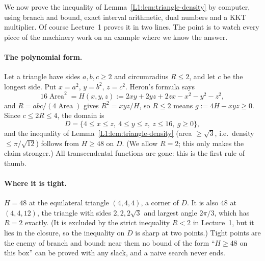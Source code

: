 We now prove the inequality of Lemma~\ref{L1:lem:triangle-density} by computer, using branch and bound, exact interval
arithmetic, dual numbers and a KKT multiplier. Of course Lecture~1 proves it in two lines. The point is to
watch every piece of the machinery work on an example where we know the answer.

\paragraph{The polynomial form.} Let a triangle have sides $a,b,c\ge2$ and circumradius $R\le2$, and let
$c$ be the longest side. Put $x=a^2$, $y=b^2$, $z=c^2$. Heron's formula says
\[
  16\operatorname{Area}^2=H(x,y,z):=2xy+2yz+2zx-x^2-y^2-z^2,
\]
and $R=abc/(4\operatorname{Area})$ gives $R^2=xyz/H$, so $R\le2$ means $g:=4H-xyz\ge0$. Since $c\le2R\le4$,
the domain is
\[
  D=\{4\le x\le z,\ 4\le y\le z,\ z\le16,\ g\ge0\},
\]
and the inequality of Lemma~\ref{L1:lem:triangle-density} (area $\ge\sqrt3$, i.e.\ density
$\le\pi/\sqrt{12}$) follows from $H\ge48$ on $D$. (We allow $R=2$; this only makes the claim stronger.) All transcendental functions are gone: this is
the first rule of thumb.

\paragraph{Where it is tight.} $H=48$ at the equilateral triangle $(4,4,4)$, a corner of $D$. It is also
$48$ at $(4,4,12)$, the triangle with sides $2,2,2\sqrt3$ and largest angle $2\pi/3$, which has $R=2$
exactly. (It is excluded by the strict inequality $R<2$ in Lecture~1, but it lies in the closure, so the
inequality on $D$ is sharp at two points.) Tight points are the enemy of branch and bound: near them no bound
of the form ``$H\ge48$ on this box'' can be proved with any slack, and a naive search never ends.

